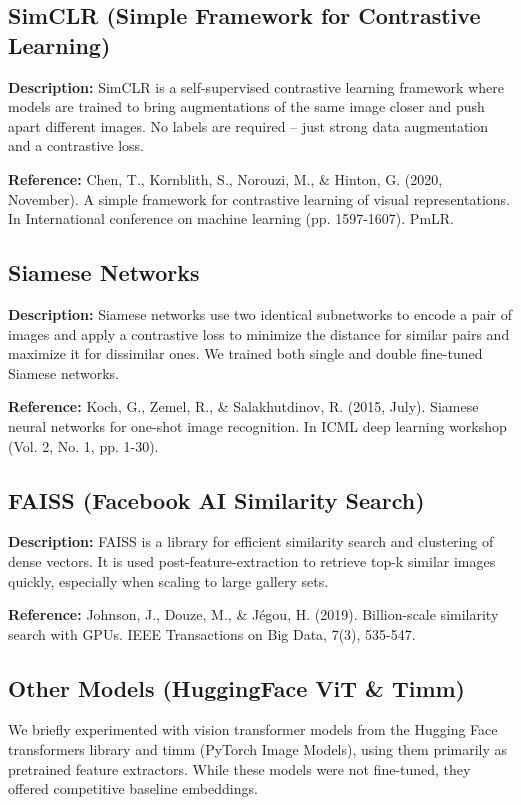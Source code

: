 \documentclass[10pt,twocolumn,letterpaper]{article}
\begin{document}
\subsection{SimCLR (Simple Framework for Contrastive Learning)}
\textbf{Description:} SimCLR is a self-supervised contrastive learning framework where models are trained to bring augmentations of the same image closer and push apart different images. No labels are required -- just strong data augmentation and a contrastive loss.

\textbf{Reference:} Chen, T., Kornblith, S., Norouzi, M., \& Hinton, G. (2020, November). A simple framework for contrastive learning of visual representations. In International conference on machine learning (pp. 1597-1607). PmLR.

\subsection{Siamese Networks}
\textbf{Description:} Siamese networks use two identical subnetworks to encode a pair of images and apply a contrastive loss to minimize the distance for similar pairs and maximize it for dissimilar ones. We trained both single and double fine-tuned Siamese networks.

\textbf{Reference:} Koch, G., Zemel, R., \& Salakhutdinov, R. (2015, July). Siamese neural networks for one-shot image recognition. In ICML deep learning workshop (Vol. 2, No. 1, pp. 1-30).

\subsection{FAISS (Facebook AI Similarity Search)}
\textbf{Description:} FAISS is a library for efficient similarity search and clustering of dense vectors. It is used post-feature-extraction to retrieve top-k similar images quickly, especially when scaling to large gallery sets.

\textbf{Reference:} Johnson, J., Douze, M., \& J\'egou, H. (2019). Billion-scale similarity search with GPUs. IEEE Transactions on Big Data, 7(3), 535-547.

\subsection{Other Models (HuggingFace ViT \& Timm)}
We briefly experimented with vision transformer models from the Hugging Face transformers library and timm (PyTorch Image Models), using them primarily as pretrained feature extractors. While these models were not fine-tuned, they offered competitive baseline embeddings.
\end{document}
